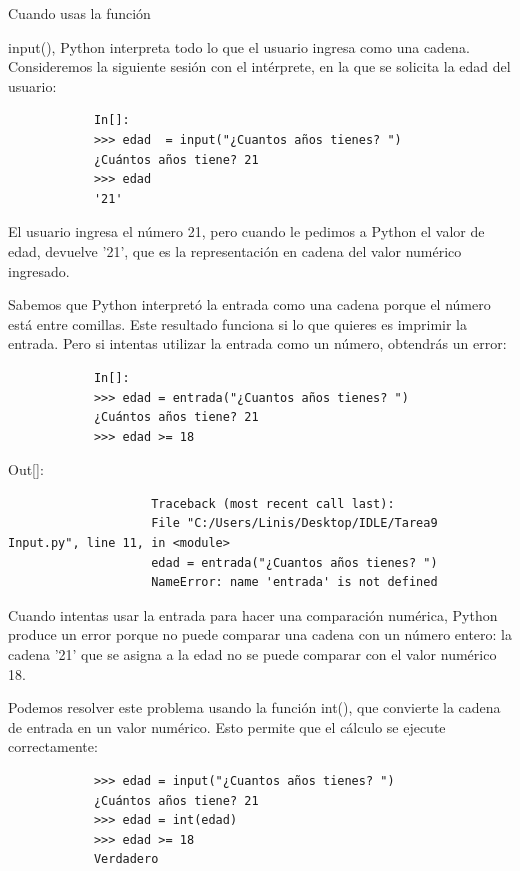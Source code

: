 	Cuando usas la función {{\ttfamily input()}, Python interpreta todo lo que el usuario
		ingresa como una cadena.  Consideremos  la  siguiente sesión con el intérprete, en la que se solicita la edad del usuario:
		
		\begin{lstlisting}
			In[]:
			>>> edad  = input("¿Cuantos años tienes? ")
			¿Cuántos años tiene? 21
			>>> edad
			'21'
		\end{lstlisting}		
		
		El usuario ingresa el número 21, pero cuando le pedimos  a Python el valor de
		edad, devuelve '21', que es la representación en cadena del valor numérico ingresado.
		
		Sabemos que Python interpretó la entrada como una cadena porque el número está entre comillas. Este resultado funciona si lo que quieres  es imprimir la entrada.  Pero si intentas utilizar la entrada como un número, obtendrás un error:
		
		\begin{lstlisting}
			In[]:
			>>> edad = entrada("¿Cuantos años tienes? ")
			¿Cuántos años tiene? 21
			>>> edad >= 18
		\end{lstlisting}
		{\ttfamily\scriptsize\scriptsize \noindent Out[]:\vspace{-0.3cm}	
			{\color{red} 	
				\begin{verbatim}
					Traceback (most recent call last):
					File "C:/Users/Linis/Desktop/IDLE/Tarea9 Input.py", line 11, in <module>
					edad = entrada("¿Cuantos años tienes? ")
					NameError: name 'entrada' is not defined
				\end{verbatim}
		}}
		
		Cuando intentas usar la entrada para hacer una comparación numérica, Python
		produce un error porque no puede comparar una cadena con un número entero: la cadena
		'21' que se asigna a la edad no se puede comparar con el valor numérico 18.
		
		Podemos resolver este problema usando la función {\ttfamily int()}, que convierte la cadena de entrada en un valor numérico. Esto permite que el cálculo se ejecute correctamente:
		\begin{lstlisting}
			>>> edad = input("¿Cuantos años tienes? ")
			¿Cuántos años tiene? 21
			>>> edad = int(edad)
			>>> edad >= 18
			Verdadero
		\end{lstlisting}
		
}
